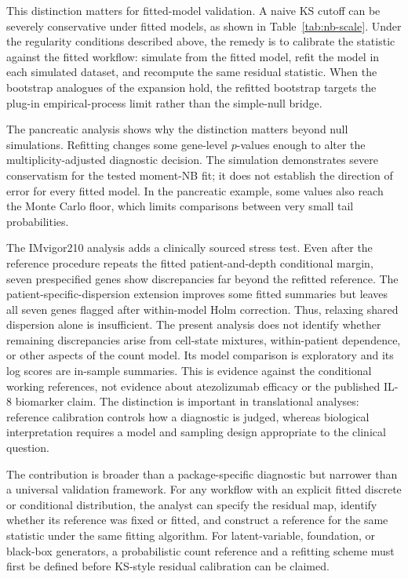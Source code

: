 \documentclass[preprint,12pt]{elsarticle}
\theoremstyle{plain}
\theoremstyle{remark}
\begin{document}
This distinction matters for fitted-model validation. A naive KS cutoff can be
severely conservative under fitted models, as shown in Table~\ref{tab:nb-scale}.
Under the regularity conditions described above, the remedy is to calibrate
the statistic against the fitted workflow:
simulate from the fitted model, refit the model in each simulated dataset, and
recompute the same residual statistic. When the bootstrap analogues of the
expansion hold, the refitted bootstrap targets the plug-in empirical-process
limit rather than the simple-null bridge.

The pancreatic analysis shows why the distinction matters beyond null
simulations. Refitting changes some gene-level $p$-values enough to alter the
multiplicity-adjusted diagnostic decision. The simulation demonstrates severe
conservatism for the tested moment-NB fit; it does not establish the direction
of error for every fitted model. In the pancreatic example, some values also
reach the Monte Carlo floor, which limits comparisons between very small
tail probabilities.

The IMvigor210 analysis adds a clinically sourced stress test. Even after the
reference procedure repeats the fitted patient-and-depth conditional margin,
seven prespecified genes show discrepancies far beyond the refitted reference.
The patient-specific-dispersion extension improves some fitted summaries but
leaves all seven genes flagged after within-model Holm correction. Thus,
relaxing shared dispersion alone is insufficient. The present analysis does
not identify whether remaining discrepancies arise from cell-state mixtures,
within-patient dependence, or other aspects of the count model. Its model
comparison is exploratory and its log scores are in-sample summaries.
This is evidence against the conditional working references, not evidence about
atezolizumab efficacy or the published IL-8 biomarker claim. The distinction is
important in translational analyses: reference calibration controls how a
diagnostic is judged, whereas biological interpretation requires a model and
sampling design appropriate to the clinical question.

The contribution is broader than a package-specific diagnostic but narrower
than a universal validation framework. For any workflow with an explicit
fitted discrete or conditional distribution, the analyst can specify the
residual map, identify whether its reference was fixed or fitted, and construct
a reference for the same statistic under the same fitting algorithm. For latent-variable,
foundation, or black-box generators, a probabilistic count reference and a
refitting scheme must first be defined before KS-style residual calibration can
be claimed.
\end{document}
